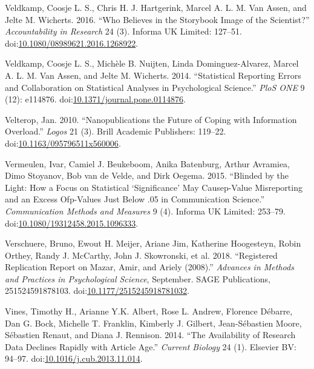 \documentclass[a5paper]{book}
\begin{document}
\hypertarget{ref-doi:10.1080ux2f08989621.2016.1268922}{}
Veldkamp, Coosje L. S., Chris H. J. Hartgerink, Marcel A. L. M. Van
Assen, and Jelte M. Wicherts. 2016. ``Who Believes in the Storybook
Image of the Scientist?'' \emph{Accountability in Research} 24 (3).
Informa UK Limited: 127--51.
doi:\href{https://doi.org/10.1080/08989621.2016.1268922}{10.1080/08989621.2016.1268922}.

\hypertarget{ref-doi:10.1371ux2fjournal.pone.0114876}{}
Veldkamp, Coosje L. S., Michèle B. Nuijten, Linda Dominguez-Alvarez,
Marcel A. L. M. Van Assen, and Jelte M. Wicherts. 2014. ``Statistical
Reporting Errors and Collaboration on Statistical Analyses in
Psychological Science.'' \emph{PloS ONE} 9 (12): e114876.
doi:\href{https://doi.org/10.1371/journal.pone.0114876}{10.1371/journal.pone.0114876}.

\hypertarget{ref-doi:10.1163ux2f095796511X560006}{}
Velterop, Jan. 2010. ``Nanopublications the Future of Coping with
Information Overload.'' \emph{Logos} 21 (3). Brill Academic Publishers:
119--22.
doi:\href{https://doi.org/10.1163/095796511x560006}{10.1163/095796511x560006}.

\hypertarget{ref-doi:10.1080ux2f19312458.2015.1096333}{}
Vermeulen, Ivar, Camiel J. Beukeboom, Anika Batenburg, Arthur Avramiea,
Dimo Stoyanov, Bob van de Velde, and Dirk Oegema. 2015. ``Blinded by the
Light: How a Focus on Statistical `Significance' May Causep-Value
Misreporting and an Excess Ofp-Values Just Below .05 in Communication
Science.'' \emph{Communication Methods and Measures} 9 (4). Informa UK
Limited: 253--79.
doi:\href{https://doi.org/10.1080/19312458.2015.1096333}{10.1080/19312458.2015.1096333}.

\hypertarget{ref-doi:10.1177ux2f2515245918781032}{}
Verschuere, Bruno, Ewout H. Meijer, Ariane Jim, Katherine Hoogesteyn,
Robin Orthey, Randy J. McCarthy, John J. Skowronski, et al. 2018.
``Registered Replication Report on Mazar, Amir, and Ariely (2008).''
\emph{Advances in Methods and Practices in Psychological Science},
September. SAGE Publications, 251524591878103.
doi:\href{https://doi.org/10.1177/2515245918781032}{10.1177/2515245918781032}.

\hypertarget{ref-doi:10.1016ux2fj.cub.2013.11.014}{}
Vines, Timothy H., Arianne Y.K. Albert, Rose L. Andrew, Florence
Débarre, Dan G. Bock, Michelle T. Franklin, Kimberly J. Gilbert,
Jean-Sébastien Moore, Sébastien Renaut, and Diana J. Rennison. 2014.
``The Availability of Research Data Declines Rapidly with Article Age.''
\emph{Current Biology} 24 (1). Elsevier BV: 94--97.
doi:\href{https://doi.org/10.1016/j.cub.2013.11.014}{10.1016/j.cub.2013.11.014}.
\end{document}
